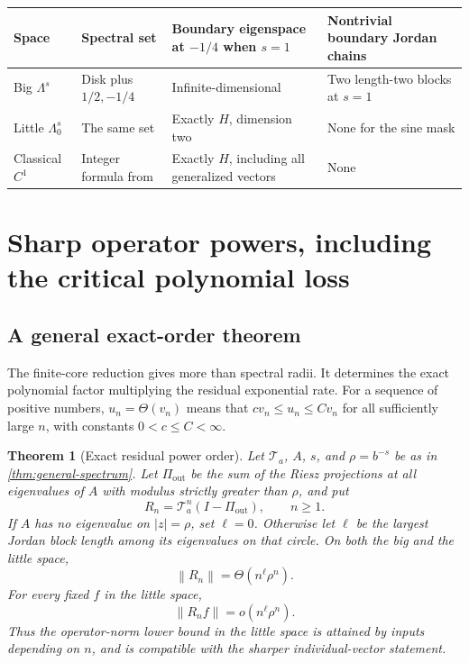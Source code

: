 \documentclass[11pt,a4paper]{article}
\numberwithin{equation}{section}
\newtheorem{theorem}{Theorem}[section]
\theoremstyle{definition}
\theoremstyle{remark}
\newcommand{\Ta}{\mathcal T_a}
\newcommand{\norm}[1]{\left\lVert#1\right\rVert}
\newcommand{\smallspace}{\Lambda_0}
\begin{document}
\begin{center}
\small
\begin{tabularx}{\textwidth}{@{}p{}YYY@{}}
\toprule
Space & Spectral set & Boundary eigenspace at $-1/4$ when $s=1$
 & Nontrivial boundary Jordan chains\\
\midrule
Big $\Lambda^s$ & Disk plus $1/2,-1/4$ & Infinite-dimensional
 & Two length-two blocks at $s=1$\\
Little $\smallspace^s$ & The same set & Exactly $H$, dimension two
 & None for the sine mask\\
Classical $C^1$ & Integer formula from \cite{repo-cr} & Exactly $H$,
including all generalized vectors & None\\
\bottomrule
\end{tabularx}
\end{center}

\section{Sharp operator powers, including the critical polynomial loss}
\label{sec:powers}

\subsection{A general exact-order theorem}
The finite-core reduction gives more than spectral radii. It determines
the exact polynomial factor multiplying the residual exponential rate.
For a sequence of positive numbers, $u_n=\Theta(v_n)$ means that
$c v_n\le u_n\le C v_n$ for all sufficiently large $n$, with constants
$0<c\le C<\infty$.

\begin{theorem}[Exact residual power order]
\label{thm:general-powers}
Let $\Ta$, $A$, $s$, and $\rho=b^{-s}$ be as in
\cref{thm:general-spectrum}. Let $\Pi_{\mathrm{out}}$ be the sum of
the Riesz projections at all eigenvalues of $A$ with modulus strictly
greater than $\rho$, and put
\begin{equation}
 R_n=\Ta^n(I-\Pi_{\mathrm{out}}),\qquad n\ge1.
 \label{eq:residual}
\end{equation}
If $A$ has no eigenvalue on $|z|=\rho$, set $\ell=0$. Otherwise let
$\ell$ be the largest Jordan block length among its eigenvalues on
that circle. On both the big and the little space,
\begin{equation}
 \norm{R_n}=\Theta(n^\ell\rho^n).
 \label{eq:general-power-order}
\end{equation}
For every fixed $f$ in the little space,
\begin{equation}
 \norm{R_n f}=o(n^\ell\rho^n).
 \label{eq:little-individual}
\end{equation}
Thus the operator-norm lower bound in the little space is attained by
inputs depending on $n$, and is compatible with the sharper
individual-vector statement.
\end{theorem}
\end{document}
